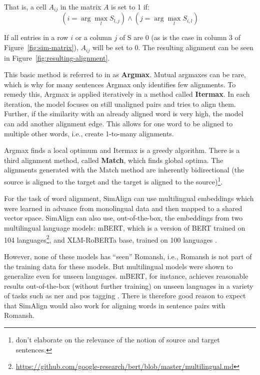 That is, a cell $A_{ij}$ in the matrix $A$ is set to 1 if:
\[
	(i= \arg \max_l S_{l,j}) \land (j=\arg\max_l S_{i,l})
\]


If all entries in a row $i$ or a column $j$ of S are 0 (as is the case in column 3 of Figure~\ref{fig:sim-matrix}), $A_{ij}$ will be set to 0.
The resulting alignment can be seen in Figure~\ref{fig:resulting-alignment}.

This basic method is referred to in \textcite{jalili-sabet-etal-2020-simalign} as \textbf{Argmax}. Mutual argmaxes can be rare, which is why for many sentences Argmax only identifies few alignments. 
To remedy this, Argmax is applied iteratively in a method called \textbf{Itermax}. 
In each iteration, the model focuses on still unaligned pairs and tries to align them. 
Further, if the similarity with an already aligned word is very high, the model can add another alignment edge. 
This allows for one word to be aligned to multiple other words, i.e., create 1-to-many alignments.

Argmax finds a local optimum and Itermax is a greedy algorithm. 
There is a third alignment method, called \textbf{Match}, which finds global optima. 
The alignments generated with the Match method are inherently bidirectional (the source is aligned to the target and the target is aligned to the source)\footnote{\textcite{jalili-sabet-etal-2020-simalign} don't elaborate on the relevance  of the notion of source and target sentences.}.

For the task of word alignment, SimAlign can use multilingual embeddings which were learned in advance from monolingual data and then mapped to a shared vector space. 
SimAlign can also use, out-of-the-box, the embeddings from two multilingual language models: mBERT, which is a version of BERT \autocite{delvin-chang-2018-bert} trained on 104 languages\footnote{\url{https://github.com/google-research/bert/blob/master/multilingual.md}}, and XLM-RoBERTa base, trained on 100 languages \autocite{conneau-etal-2020-xlm}. 

However, none of these models has \enquote{seen} Romansh, i.e., Romansh is not part of the training data for these models. 
But multilingual models were shown to generalize even for unseen languages. 
mBERT, for instance, achieves reasonable results out-of-the-box (without further training) on unseen languages in a variety of tasks such as \acrfull{ner} and \acrfull{pos} tagging \autocite{pires-etal-2019-multilingual}. 
There is therefore good reason to expect that SimAlign would also work for aligning words in sentence pairs with Romansh.


